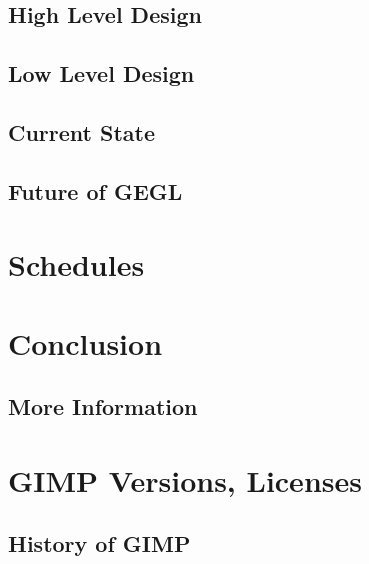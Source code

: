 \documentclass{report}
\begin{document}
\section{High Level Design}

\section{Low Level Design}

\section{Current State}

\section{Future of GEGL}



\chapter{Schedules}


\chapter{Conclusion}

\section{More Information}

{
\small


}

\appendix

\chapter{GIMP Versions, Licenses}
\section{History of GIMP} 

\end{document}
